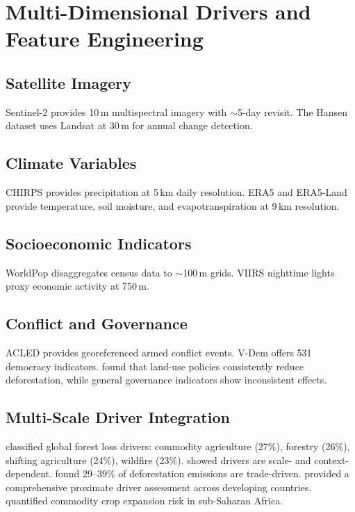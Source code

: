 \documentclass[11pt,a4paper]{article}
\begin{document}
\section{Multi-Dimensional Drivers and Feature Engineering}

\subsection{Satellite Imagery}

Sentinel-2 \citep{Drusch2012} provides 10\,m multispectral imagery with $\sim$5-day revisit. The Hansen dataset \citep{Hansen2013} uses Landsat at 30\,m for annual change detection.

\subsection{Climate Variables}

CHIRPS \citep{Funk2015} provides precipitation at 5\,km daily resolution. ERA5 \citep{Hersbach2020} and ERA5-Land \citep{MunozSabater2021} provide temperature, soil moisture, and evapotranspiration at 9\,km resolution.

\subsection{Socioeconomic Indicators}

WorldPop \citep{Tatem2017} disaggregates census data to $\sim$100\,m grids. VIIRS nighttime lights \citep{Elvidge2017} proxy economic activity at 750\,m.

\subsection{Conflict and Governance}

ACLED \citep{Raleigh2010} provides georeferenced armed conflict events. V-Dem \citep{VDem2024} offers 531 democracy indicators. \citet{Busch2017} found that land-use policies consistently reduce deforestation, while general governance indicators show inconsistent effects.

\subsection{Multi-Scale Driver Integration}

\citet{Curtis2018} classified global forest loss drivers: commodity agriculture (27\%), forestry (26\%), shifting agriculture (24\%), wildfire (23\%). \citet{Armenteras2019} showed drivers are scale- and context-dependent. \citet{Pendrill2019} found 29--39\% of deforestation emissions are trade-driven. \citet{Hosonuma2012} provided a comprehensive proximate driver assessment across developing countries. \citet{Ordway2017} quantified commodity crop expansion risk in sub-Saharan Africa.
\end{document}
